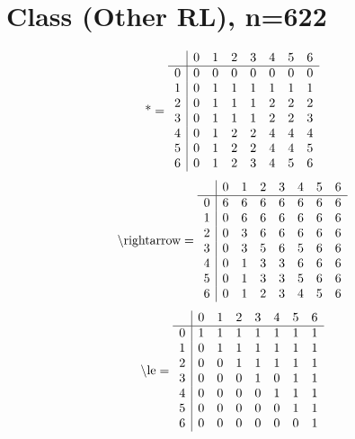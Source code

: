 \documentclass[11pt]{article}
\begin{document}
\section{Class (Other RL), n=622}
\[\text{*} = 
\begin{array}{r | r r r r r r r}
 & 0 & 1 & 2 & 3 & 4 & 5 & 6 \\ \hline
0 & 0 & 0 & 0 & 0 & 0 & 0 & 0 \\
1 & 0 & 1 & 1 & 1 & 1 & 1 & 1 \\
2 & 0 & 1 & 1 & 1 & 2 & 2 & 2 \\
3 & 0 & 1 & 1 & 1 & 2 & 2 & 3 \\
4 & 0 & 1 & 2 & 2 & 4 & 4 & 4 \\
5 & 0 & 1 & 2 & 2 & 4 & 4 & 5 \\
6 & 0 & 1 & 2 & 3 & 4 & 5 & 6 \\
\end{array}
\]
\[\text{\textbackslash rightarrow} = 
\begin{array}{r | r r r r r r r}
 & 0 & 1 & 2 & 3 & 4 & 5 & 6 \\ \hline
0 & 6 & 6 & 6 & 6 & 6 & 6 & 6 \\
1 & 0 & 6 & 6 & 6 & 6 & 6 & 6 \\
2 & 0 & 3 & 6 & 6 & 6 & 6 & 6 \\
3 & 0 & 3 & 5 & 6 & 5 & 6 & 6 \\
4 & 0 & 1 & 3 & 3 & 6 & 6 & 6 \\
5 & 0 & 1 & 3 & 3 & 5 & 6 & 6 \\
6 & 0 & 1 & 2 & 3 & 4 & 5 & 6 \\
\end{array}
\]
\[\text{\textbackslash le} = 
\begin{array}{r | r r r r r r r}
 & 0 & 1 & 2 & 3 & 4 & 5 & 6 \\ \hline
0 & 1 & 1 & 1 & 1 & 1 & 1 & 1 \\
1 & 0 & 1 & 1 & 1 & 1 & 1 & 1 \\
2 & 0 & 0 & 1 & 1 & 1 & 1 & 1 \\
3 & 0 & 0 & 0 & 1 & 0 & 1 & 1 \\
4 & 0 & 0 & 0 & 0 & 1 & 1 & 1 \\
5 & 0 & 0 & 0 & 0 & 0 & 1 & 1 \\
6 & 0 & 0 & 0 & 0 & 0 & 0 & 1 \\
\end{array}
\]
\end{document}

